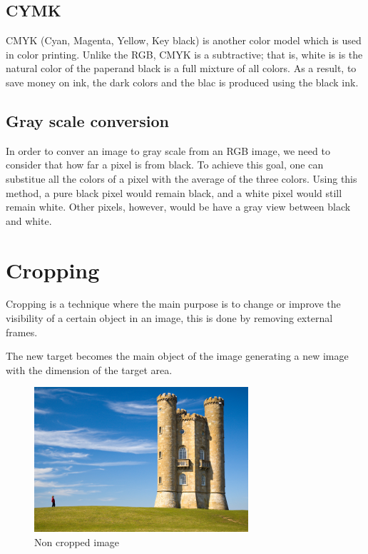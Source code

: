 \documentclass{article}
\begin{document}
	\subsection{CYMK}

		CMYK (Cyan, Magenta, Yellow, Key black) is another color model which is used in color printing. Unlike the RGB, CMYK is a subtractive; that is, white is is the natural color of the paperand black is a full mixture of all colors.
		As a result, to save money on ink, the dark colors and the blac is produced using the black ink.

	\subsection{Gray scale conversion}

		In order to conver an image to gray scale from an RGB image, we need to consider that how far a pixel is from black. To achieve this goal, one can substitue all the colors of a pixel with the average of the three colors. Using
		this method, a pure black pixel would remain black, and a white pixel would still remain white. Other pixels, however, would be have a gray view between black and white.

\section{Cropping}

	Cropping is a technique where the main purpose is to change or improve the visibility of a certain object in an image, 
	this is done by removing external frames. 

	The new target becomes the main object of the image generating a new image with the dimension of the target area.  

	\begin{figure} [H]
		\centering
		\includegraphics[scale=1]{images/crop_1}
		\caption{Non cropped image \label{crop_1}}
	\end{figure}
\end{document}
